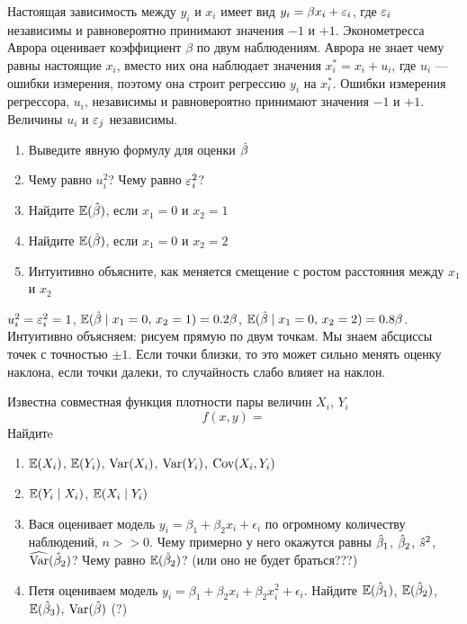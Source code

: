 \documentclass[pdftex,11pt,openany]{book}\usepackage[]{graphicx}\usepackage[]{color}
\begin{document}
\begin{problem}
Настоящая зависимость между $y_i$ и $x_i$ имеет вид $y_i=\beta x_i +\varepsilon_i$, где $\varepsilon_i$ независимы и равновероятно принимают значения $-1$ и $+1$. Эконометресса Аврора оценивает коэффициент $\beta$ по двум наблюдениям. Аврора не знает чему равны настоящие $x_i$, вместо них она наблюдает значения $x^*_i=x_i+u_i$, где $u_i$ --- ошибки измерения, поэтому она строит регрессию $y_i$ на $x_i^*$. Ошибки измерения регрессора, $u_i$, независимы и равновероятно принимают значения $-1$ и $+1$. Величины $u_i$ и $\varepsilon_j$ независимы.
\begin{enumerate}
\item Выведите явную формулу для оценки $\hat{\beta}$
\item Чему равно $u_i^2$? Чему равно $\varepsilon_i^2$?
\item Найдите $\mathbb{E}(\hat{\beta})$, если $x_1=0$ и $x_2=1$
\item Найдите $\mathbb{E}(\hat{\beta})$, если $x_1=0$ и $x_2=2$
\item Интуитивно объясните, как меняется смещение с ростом расстояния между $x_1$ и $x_2$
\end{enumerate}
\end{problem}

\begin{solution}
$u_i^2=\varepsilon_i^2=1$, $\mathbb{E}(\hat{\beta} \mid x_1=0, \, x_2=1)=0.2\beta$, $\mathbb{E}(\hat{\beta} \mid x_1=0, \, x_2=2)=0.8\beta$. Интуитивно объясняем: рисуем прямую по двум точкам. Мы знаем абсциссы точек с точностью $\pm 1$. Если точки близки, то это может сильно менять оценку наклона, если точки далеки, то случайность слабо влияет на наклон.
\end{solution}

\begin{problem}
Известна совместная функция плотности пары величин $X_i$, $Y_i$
\[
f(x,y)=
\]
Найдитe 
\begin{enumerate}
\item $\mathbb{E}(X_i)$, $\mathbb{E}(Y_i)$, $\operatorname{Var}(X_i)$, $\operatorname{Var}(Y_i)$, $\operatorname{Cov}(X_i,Y_i)$
\item $\mathbb{E}(Y_i \mid X_i)$, $\mathbb{E}(X_i \mid Y_i)$
\item Вася оценивает модель $y_i=\beta_1+\beta_2 x_i+\epsilon_i$ по огромному количеству наблюдений, $n>>0$. Чему примерно у него окажутся равны $\hat{\beta}_1$, $\hat{\beta}_2$, $\hat{s}^2$, $\widehat{\operatorname{Var}}(\hat{\beta}_2)$? Чему равно $\mathbb{E}(\hat{\beta}_2)$? (или оно не будет браться???)
\item Петя оцениваем модель $y_i=\beta_1+\beta_2 x_i+\beta_2 x_i^2+\epsilon_i$. Найдите $\mathbb{E}(\hat{\beta}_1)$, $\mathbb{E}(\hat{\beta}_2)$, $\mathbb{E}(\hat{\beta}_3)$, $\operatorname{Var}(\hat{\beta})$ (?)
\end{enumerate}
\end{problem}
\end{document}
